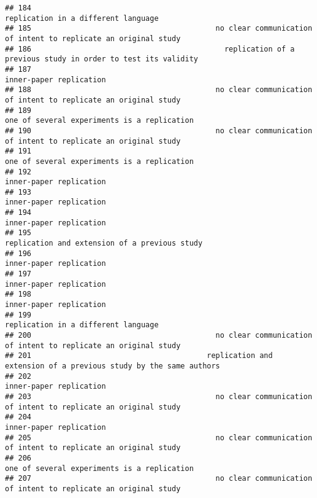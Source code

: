 \documentclass[
  english,
  man]{apa6}
\begin{document}
\begin{verbatim}
## 184                                                                      replication in a different language
## 185                                          no clear communication of intent to replicate an original study
## 186                                            replication of a previous study in order to test its validity
## 187                                                                                  inner-paper replication
## 188                                          no clear communication of intent to replicate an original study
## 189                                                              one of several experiments is a replication
## 190                                          no clear communication of intent to replicate an original study
## 191                                                              one of several experiments is a replication
## 192                                                                                  inner-paper replication
## 193                                                                                  inner-paper replication
## 194                                                                                  inner-paper replication
## 195                                                            replication and extension of a previous study
## 196                                                                                  inner-paper replication
## 197                                                                                  inner-paper replication
## 198                                                                                  inner-paper replication
## 199                                                                      replication in a different language
## 200                                          no clear communication of intent to replicate an original study
## 201                                        replication and extension of a previous study by the same authors
## 202                                                                                  inner-paper replication
## 203                                          no clear communication of intent to replicate an original study
## 204                                                                                  inner-paper replication
## 205                                          no clear communication of intent to replicate an original study
## 206                                                              one of several experiments is a replication
## 207                                          no clear communication of intent to replicate an original study

\end{verbatim}
\end{document}
